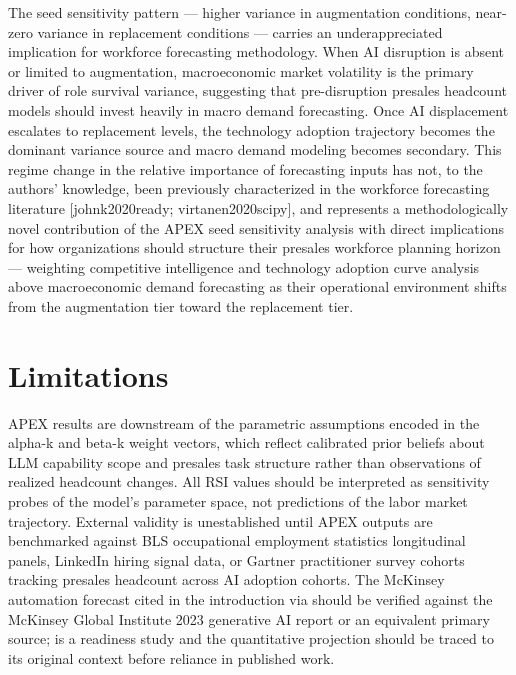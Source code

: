 \documentclass[10pt, conference]{IEEEtran}
\begin{document}
{The seed sensitivity pattern --- higher variance in augmentation conditions, near-zero variance in replacement conditions --- carries an underappreciated implication for workforce forecasting methodology. When AI disruption is absent or limited to augmentation, macroeconomic market volatility is the primary driver of role survival variance, suggesting that pre-disruption presales headcount models should invest heavily in macro demand forecasting. Once AI displacement escalates to replacement levels, the technology adoption trajectory becomes the dominant variance source and macro demand modeling becomes secondary. This regime change in the relative importance of forecasting inputs has not, to the authors' knowledge, been previously characterized in the workforce forecasting literature [johnk2020ready; virtanen2020scipy], and represents a methodologically novel contribution of the APEX seed sensitivity analysis with direct implications for how organizations should structure their presales workforce planning horizon --- weighting competitive intelligence and technology adoption curve analysis above macroeconomic demand forecasting as their operational environment shifts from the augmentation tier toward the replacement tier.

\section{Limitations}

\label{sec:limitations}

APEX results are downstream of the parametric assumptions encoded in the alpha-k and beta-k weight vectors, which reflect calibrated prior beliefs about LLM capability scope and presales task structure rather than observations of realized headcount changes. All RSI values should be interpreted as sensitivity probes of the model's parameter space, not predictions of the labor market trajectory. External validity is unestablished until APEX outputs are benchmarked against BLS occupational employment statistics longitudinal panels, LinkedIn hiring signal data, or Gartner practitioner survey cohorts tracking presales headcount across AI adoption cohorts. The McKinsey automation forecast cited in the introduction via \cite{johnk2020ready} should be verified against the McKinsey Global Institute 2023 generative AI report or an equivalent primary source; \cite{johnk2020ready} is a readiness study and the quantitative projection should be traced to its original context before reliance in published work.

}
\end{document}
